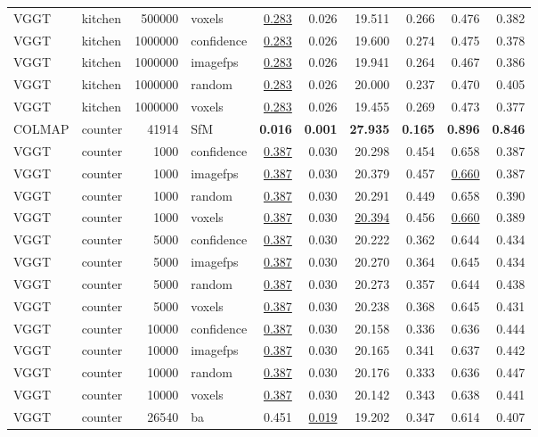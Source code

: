 \begin{table}[H]
\begin{tabular}{llrlrrrrrr}
VGGT & kitchen & 500000 & voxels & \underline{0.283} & 0.026 & 19.511 & 0.266 & 0.476 & 0.382 \\
VGGT & kitchen & 1000000 & confidence & \underline{0.283} & 0.026 & 19.600 & 0.274 & 0.475 & 0.378 \\
VGGT & kitchen & 1000000 & imagefps & \underline{0.283} & 0.026 & 19.941 & 0.264 & 0.467 & 0.386 \\
VGGT & kitchen & 1000000 & random & \underline{0.283} & 0.026 & 20.000 & 0.237 & 0.470 & 0.405 \\
VGGT & kitchen & 1000000 & voxels & \underline{0.283} & 0.026 & 19.455 & 0.269 & 0.473 & 0.377 \\
\midrule
COLMAP & counter & 41914 & SfM & \textbf{0.016} & \textbf{0.001} & \textbf{27.935} & \textbf{0.165} & \textbf{0.896} & \textbf{0.846} \\
VGGT & counter & 1000 & confidence & \underline{0.387} & 0.030 & 20.298 & 0.454 & 0.658 & 0.387 \\
VGGT & counter & 1000 & imagefps & \underline{0.387} & 0.030 & 20.379 & 0.457 & \underline{0.660} & 0.387 \\
VGGT & counter & 1000 & random & \underline{0.387} & 0.030 & 20.291 & 0.449 & 0.658 & 0.390 \\
VGGT & counter & 1000 & voxels & \underline{0.387} & 0.030 & \underline{20.394} & 0.456 & \underline{0.660} & 0.389 \\
VGGT & counter & 5000 & confidence & \underline{0.387} & 0.030 & 20.222 & 0.362 & 0.644 & 0.434 \\
VGGT & counter & 5000 & imagefps & \underline{0.387} & 0.030 & 20.270 & 0.364 & 0.645 & 0.434 \\
VGGT & counter & 5000 & random & \underline{0.387} & 0.030 & 20.273 & 0.357 & 0.644 & 0.438 \\
VGGT & counter & 5000 & voxels & \underline{0.387} & 0.030 & 20.238 & 0.368 & 0.645 & 0.431 \\
VGGT & counter & 10000 & confidence & \underline{0.387} & 0.030 & 20.158 & 0.336 & 0.636 & 0.444 \\
VGGT & counter & 10000 & imagefps & \underline{0.387} & 0.030 & 20.165 & 0.341 & 0.637 & 0.442 \\
VGGT & counter & 10000 & random & \underline{0.387} & 0.030 & 20.176 & 0.333 & 0.636 & 0.447 \\
VGGT & counter & 10000 & voxels & \underline{0.387} & 0.030 & 20.142 & 0.343 & 0.638 & 0.441 \\
VGGT & counter & 26540 & ba & 0.451 & \underline{0.019} & 19.202 & 0.347 & 0.614 & 0.407 \\

\end{tabular}
\end{table}
